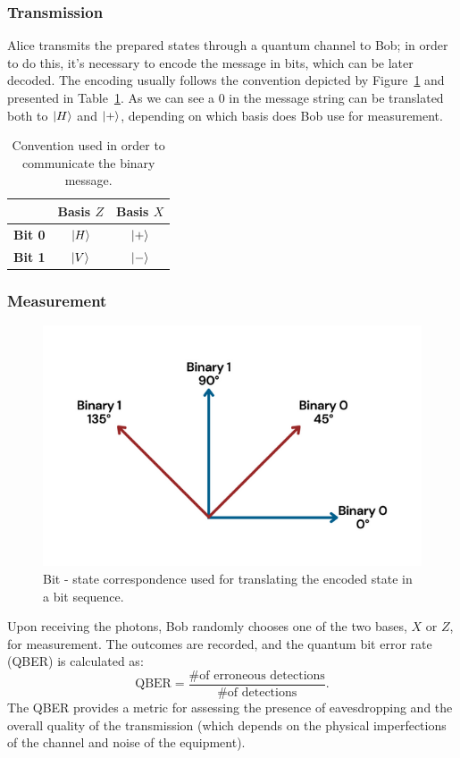 \documentclass[prl,twocolumn]{revtex4-1}
\begin{document}
\subsubsection{Transmission}
Alice transmits the prepared states through a quantum channel to Bob; in order to do this, it's necessary to encode the message in bits, which can be later decoded. The encoding usually follows the convention depicted by Figure~\ref{fig:basis_1} and presented in Table~\ref{tab:encoding}. As we can see a $0$ in the message string can be translated both to $\ket H$ and $\ket +$, depending on which basis does Bob use for measurement.


\begin{table}[!b]
    \begin{center}
    \begin{tabular}{c|c|c}
        &\textbf{Basis $Z$}& \textbf{Basis $X$}\\
        \hline
        \hline
        \textbf{Bit 0} & $\ket H$ & $\ket +$\\
        \hline
        \textbf{Bit 1} & $\ket V$ & $\ket -$ \\
        \hline
    \end{tabular}
    \caption{Convention used in order to communicate the binary message.}
    \label{tab:encoding}
    \end{center}
\end{table}

\subsubsection{Measurement}
\begin{figure}
    \centering
    \includegraphics[width=\linewidth]{Images/basis (1).png}
    \caption{Bit - state correspondence used for translating the encoded state in a bit sequence.}
    \label{fig:basis_1}
\end{figure}
Upon receiving the photons, Bob randomly chooses one of the two bases, $X$ or $Z$, for measurement. The outcomes are recorded, and the quantum bit error rate (QBER) is calculated as:
\begin{equation}
\text{QBER} = \frac{\text{\# of erroneous detections}}{\text{\# of detections}}.
\end{equation}
The QBER provides a metric for assessing the presence of eavesdropping and the overall quality of the transmission (which depends on the physical imperfections of the channel and noise of the equipment).
\end{document}
